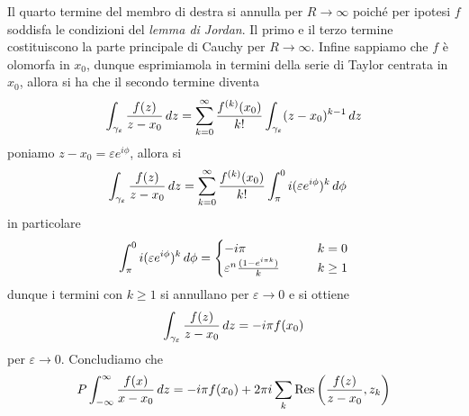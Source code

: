 \documentclass{article}
\begin{document}
Il quarto termine del membro di destra si annulla per $R \rightarrow \infty$ poiché per ipotesi $f$ soddisfa le condizioni del \textit{lemma di Jordan}. Il primo e il terzo termine costituiscono la parte principale di Cauchy per $R \rightarrow \infty$. Infine sappiamo che $f$ è olomorfa in $x_0$, dunque esprimiamola in termini della serie di Taylor centrata in $x_0$, allora si ha che il secondo termine diventa
\begin{gather}
    \int_{\gamma_\varepsilon}\frac{f(z)}{z - x_0} \, dz = \sum_{k = 0}^\infty \frac{f^{(k)}(x_0)}{k!}\int_{\gamma_\varepsilon}(z - x_0)^{k - 1} \, dz \notag
\end{gather}
poniamo $z - x_0 = \varepsilon e^{i\phi}$, allora si
\begin{align}
    \int_{\gamma_\varepsilon}\frac{f(z)}{z - x_0} \, dz &= \sum_{k = 0}^\infty \frac{f^{(k)}(x_0)}{k!}\int_\pi^0 i(\varepsilon e^{i\phi})^k \, d\phi \notag
\end{align}
in particolare
\begin{gather}
    \int_\pi^0 i(\varepsilon e^{i\phi})^k \, d\phi = \begin{cases}
        -i\pi \qquad &k = 0 \\
        \varepsilon^n\frac{(1 - e^{i\pi k})}{k} \qquad &k \geq 1
    \end{cases} \notag
\end{gather}
dunque i termini con $k \geq 1$ si annullano per $\varepsilon \rightarrow 0$ e si ottiene
\begin{gather}
    \int_{\gamma_\varepsilon}\frac{f(z)}{z - x_0} \, dz = -i\pi f(x_0) \notag
\end{gather}
per $\varepsilon \rightarrow 0$. Concludiamo che
\begin{gather}
    P\int_{-\infty}^\infty\frac{f(x)}{x - x_0} \, dz = -i\pi f(x_0) + 2\pi i\sum_k\mathrm{Res}\left(\frac{f(z)}{z - x_0}, z_k\right) \notag
\end{gather}

\newpage
\end{document}
